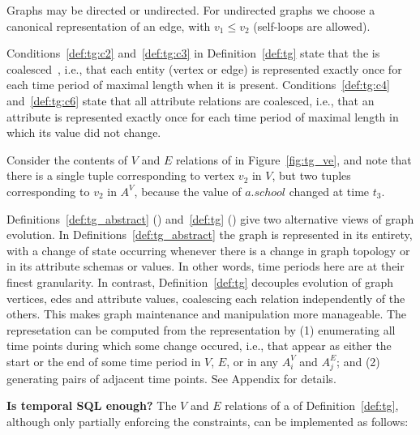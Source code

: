 Graphs may be directed or undirected.  For undirected graphs we choose
a canonical representation of an edge, with $v_1 \leq v_2$ (self-loops
are allowed).

Conditions~\ref{def:tg:c2} and~\ref{def:tg:c3} in
Definition~\ref{def:tg} state that the \tg is
coalesced~\cite{DBLP:conf/vldb/BohlenSS96}, i.e., that each entity
(vertex or edge) is represented exactly once for each time period of
maximal length when it is present.  Conditions~\ref{def:tg:c4}
and~\ref{def:tg:c6} state that all attribute relations are coalesced,
i.e., that an attribute is represented exactly once for each time
period of maximal length in which its value did not change.

Consider the contents of $V$ and $E$ relations of  in
Figure~\ref{fig:tg_ve}, and note that there is a single tuple
corresponding to vertex $v_2$ in $V$, but two tuples corresponding to
$v_2$ in $A^{V}$, because the value of $a.school$ changed at time
$t_3$.

Definitions~\ref{def:tg_abstract} (\rgs) and~\ref{def:tg} (\ve) give
two alternative views of graph evolution.  In
Definitions~\ref{def:tg_abstract} the graph is represented in its
entirety, with a change of state occurring whenever there is a change
in graph topology or in its attribute schemas or values.  In other
words, time periods here are at their finest granularity.  In
contrast, Definition~\ref{def:tg} decouples evolution of graph
vertices, edes and attribute values, coalescing each relation
independently of the others.  This makes graph maintenance and
manipulation more manageable.  The \rgs represetation can be computed
from the \ve representation by (1) enumerating all time points during
which some change occured, i.e., that appear as either the start or
the end of some time period in $V$, $E$, or in any $A^{V}_i$ and
$A^{E}_j$; and (2) generating pairs of adjacent time points. See
Appendix for details.

{\bf Is temporal SQL enough?} The $V$ and $E$ relations of a \tg of
Definition~\ref{def:tg}, although only partially enforcing the
constraints, can be implemented as follows:


